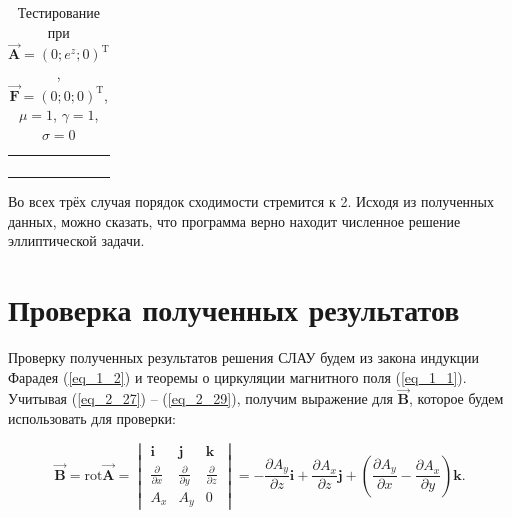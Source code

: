 \begin{table}
	\caption{Тестирование при $\overrightarrow{\textbf{A}} = (0; e^z; 0)^{\text{T}}$, $\overrightarrow{\textbf{F}} = (0; 0; 0)^{\text{T}}$, $\mu = 1$, $\gamma = 1$, $\sigma = 0$}
	\centering
	\small
	\begin{tabularx}{1.0\textwidth}{| >{\raggedright\arraybackslash}X | >{\raggedright\arraybackslash}X | >{\raggedright\arraybackslash}X |>{\raggedright\arraybackslash}X |}
		\hline
		\centering{Шаг по оси $z$} & \centering{Средняя погрешность} & \centering{$\text{log}_2\left(\frac{\sigma_{i-1}}{\sigma_i}\right)$} \tabularnewline \hline		
		
		\centering{$h$} & \centering{4.1223218E-001} & \centering{-} \tabularnewline \hline
		
		\centering{${}^h/_2$} & \centering{6.9015889E-002} & \centering{2.57845668} \tabularnewline \hline
		
		\centering{${}^h/_4$} & \centering{1.4360912E-002} & \centering{2.26478117} \tabularnewline \hline
		
		\centering{${}^h/_8$} & \centering{3.28952607E-003} & \centering{2.1261957} \tabularnewline \hline
		
	\end{tabularx}
	\label{tab:test14}
\end{table}

Во всех трёх случая порядок сходимости стремится к 2. Исходя из полученных данных, можно сказать, что программа верно находит численное решение эллиптической задачи.

\section{Проверка полученных результатов}

Проверку полученных результатов решения СЛАУ будем из закона индукции Фарадея (\ref{eq_1_2}) и теоремы о циркуляции магнитного поля (\ref{eq_1_1}). Учитывая (\ref{eq_2_27}) -- (\ref{eq_2_29}), получим выражение для $\overrightarrow{\textbf{B}}$, которое будем использовать для проверки:

\begin{equation} \label{eq_3_1}
	\overrightarrow{\textbf{B}} = \text{rot} \overrightarrow{\textbf{A}} = 
	\begin{vmatrix}
		\textbf{i} & \textbf{j} & \textbf{k}\\
		\frac{\partial}{\partial x} & \frac{\partial}{\partial y} & \frac{\partial}{\partial z}\\
		A_x & A_y & 0
	\end{vmatrix}
	= -\frac{\partial A_y}{\partial z} \textbf{i} + \frac{\partial A_x}{\partial z} \textbf{j} + \left(\frac{\partial A_y}{\partial x} - \frac{\partial A_x}{\partial y}\right) \textbf{k}.
\end{equation}

